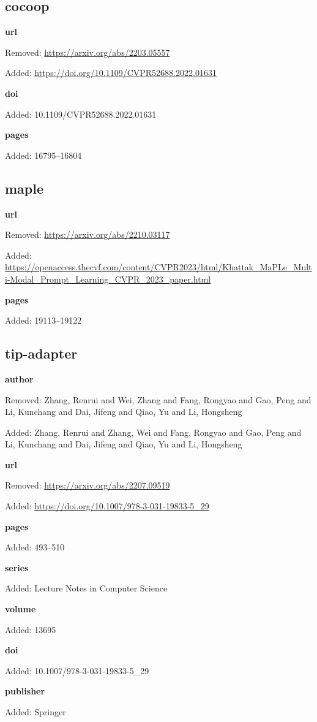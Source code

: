 \subsection*{cocoop}
\noindent\textbf{url}\par
{\color{AuditRed}Removed: \url{https://arxiv.org/abs/2203.05557}\par}
{\color{AuditGreen}Added: \url{https://doi.org/10.1109/CVPR52688.2022.01631}\par}
\noindent\textbf{doi}\par
{\color{AuditGreen}Added: 10.1109/CVPR52688.2022.01631\par}
\noindent\textbf{pages}\par
{\color{AuditGreen}Added: 16795–16804\par}
\medskip

\subsection*{maple}
\noindent\textbf{url}\par
{\color{AuditRed}Removed: \url{https://arxiv.org/abs/2210.03117}\par}
{\color{AuditGreen}Added: \url{https://openaccess.thecvf.com/content/CVPR2023/html/Khattak_MaPLe_Multi-Modal_Prompt_Learning_CVPR_2023_paper.html}\par}
\noindent\textbf{pages}\par
{\color{AuditGreen}Added: 19113–19122\par}
\medskip

\subsection*{tip-adapter}
\noindent\textbf{author}\par
{\color{AuditRed}Removed: Zhang, Renrui and Wei, Zhang and Fang, Rongyao and Gao, Peng and Li, Kunchang and Dai, Jifeng and Qiao, Yu and Li, Hongsheng\par}
{\color{AuditGreen}Added: Zhang, Renrui and Zhang, Wei and Fang, Rongyao and Gao, Peng and Li, Kunchang and Dai, Jifeng and Qiao, Yu and Li, Hongsheng\par}
\noindent\textbf{url}\par
{\color{AuditRed}Removed: \url{https://arxiv.org/abs/2207.09519}\par}
{\color{AuditGreen}Added: \url{https://doi.org/10.1007/978-3-031-19833-5_29}\par}
\noindent\textbf{pages}\par
{\color{AuditGreen}Added: 493–510\par}
\noindent\textbf{series}\par
{\color{AuditGreen}Added: Lecture Notes in Computer Science\par}
\noindent\textbf{volume}\par
{\color{AuditGreen}Added: 13695\par}
\noindent\textbf{doi}\par
{\color{AuditGreen}Added: 10.1007/978-3-031-19833-5\_29\par}
\noindent\textbf{publisher}\par
{\color{AuditGreen}Added: Springer\par}
\medskip

